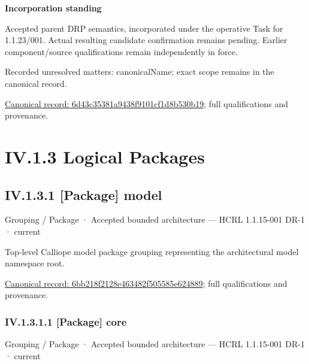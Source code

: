 \par\medskip\textbf{Incorporation standing}\par


Accepted parent DRP semantics, incorporated under the operative Task for 1.1.23/001. Actual resulting candidate confirmation remains pending. Earlier component/source qualifications remain independently in force.


{\small Recorded unresolved matters: canonicalName; exact scope remains in the canonical record.}\par
{\footnotesize \href{../../../../../../../continuum/application/data-object/6d43c35381a9438f9101cf1d8b530b19.md}{Canonical record: 6d43c35381a9438f9101cf1d8b530b19}; full qualifications and provenance.}\par
\section*{IV.1.3 Logical Packages}
\label{navigation:IV.1.3}

\subsection*{IV.1.3.1 [Package] model}
\label{navigation:IV.1.3.1}

\label{element:6bb218f2128e463482f505585e624889}
{\small Grouping / Package · Accepted bounded architecture — HCRL 1.1.15-001 DR-1 · current}\par

Top-level Calliope model package grouping representing the architectural model namespace root.


{\footnotesize \href{../../../../../../../continuum/grouping/package/6bb218f2128e463482f505585e624889.md}{Canonical record: 6bb218f2128e463482f505585e624889}; full qualifications and provenance.}\par
\subsubsection*{IV.1.3.1.1 [Package] core}
\label{navigation:IV.1.3.1.1}

\label{element:2d587cb7547e4e6a8c20aa64da0da78a}
{\small Grouping / Package · Accepted bounded architecture — HCRL 1.1.15-001 DR-1 · current}\par

